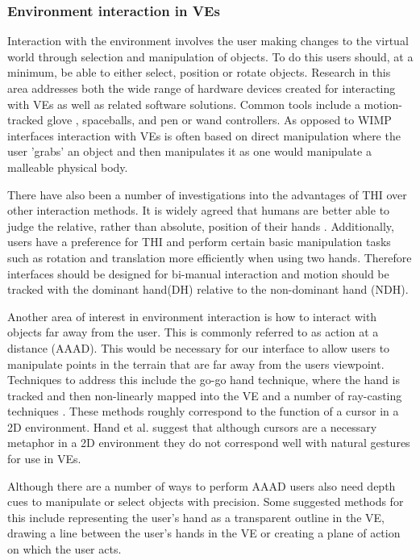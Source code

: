 \documentclass{sig-alternate-05-2015}
\begin{document}
\subsubsection{Environment interaction in VEs}
 Interaction with the environment involves the user making changes to the virtual world through selection and manipulation of objects. To do this users should, at a minimum, be able to either select, position or rotate objects\cite{Bowman2001}. Research in this area addresses both the wide range of hardware devices created for interacting with VEs as well as related software solutions. Common tools include a motion-tracked glove \cite{Zimmerman1986}, spaceballs\cite{Hand1997}, and pen or wand controllers\cite{Schultheis2012}. As opposed to WIMP interfaces interaction with VEs is often based on direct manipulation where the user 'grabs' an object and then manipulates it as one would manipulate a malleable physical body.
  
 There have also been a number of investigations into the advantages of THI over other interaction methods. It is widely agreed that humans are better able to judge the relative, rather than absolute, position of their hands \cite{Bowman1998, Buxton1986}. Additionally, users have a preference for THI\cite{Buxton1986} and perform certain basic manipulation tasks such as rotation and translation more efficiently when using two hands\cite{Schultheis2012,Balakrishnan1999}. Therefore interfaces should be designed for bi-manual interaction and motion should be tracked with the dominant hand(DH) relative to the non-dominant hand (NDH)\cite{Hinckley1994}.
 
 Another area of interest in environment interaction is how to interact with objects far away from the user. This is commonly referred to as action at a distance (AAAD). This would be necessary for our interface to allow users to manipulate points in the terrain that are far away from the users viewpoint. Techniques to address this include the go-go hand technique\cite{Poupyrev1996}, where the hand is tracked and then non-linearly mapped into the VE and a number of ray-casting techniques \cite{Bowman2001}. These methods roughly correspond to the function of a cursor in a 2D environment. Hand et al.\cite{Hand1997} suggest that although cursors are a necessary metaphor in a 2D environment they do not correspond well with natural gestures for use in VEs.
 
 Although there are a number of ways to perform AAAD users also need depth cues to manipulate or select objects with precision.\cite{Schultheis2012} Some suggested methods for this include representing the user's hand as a transparent outline in the VE\cite{Hinckley1994}, drawing a line between the user's hands in the VE\cite{Schultheis2012} or creating a plane of action\cite{Mine2014} on which the user acts.
 
\end{document}
